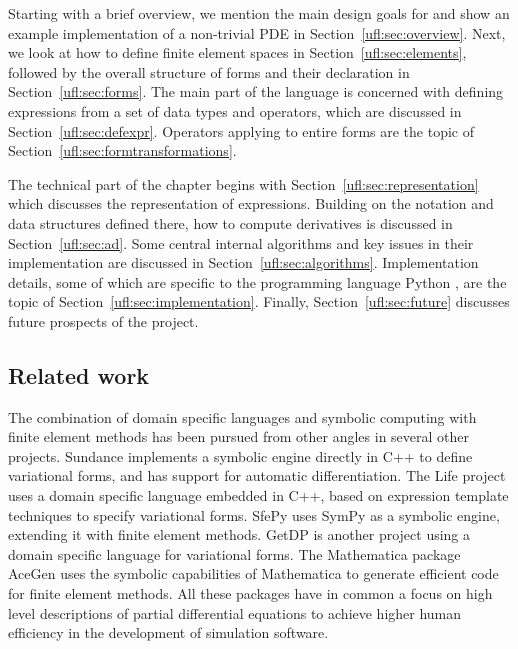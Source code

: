 Starting with a brief overview, we mention the main design goals for
\ufl{} and show an example implementation of a non-trivial PDE in
Section~\ref{ufl:sec:overview}.  Next, we look at how to define finite
element spaces in Section~\ref{ufl:sec:elements}, followed by the
overall structure of forms and their declaration in
Section~\ref{ufl:sec:forms}.  The main part of the language is
concerned with defining expressions from a set of data types and
operators, which are discussed in Section~\ref{ufl:sec:defexpr}.
Operators applying to entire forms are the topic of
Section~\ref{ufl:sec:formtransformations}.

The technical part of the chapter begins with
Section~\ref{ufl:sec:representation} which discusses the
representation of expressions.  Building on the notation and
data structures defined there, how to compute derivatives is
discussed in Section~\ref{ufl:sec:ad}.  Some central internal
algorithms and key issues in their implementation are discussed in
Section~\ref{ufl:sec:algorithms}.  Implementation details, some of which
are specific to the programming language Python \citep{Rossumothers},
are the topic of Section~\ref{ufl:sec:implementation}.  Finally,
Section~\ref{ufl:sec:future} discusses future prospects of the \ufl{}
project.

\subsection{Related work} \label{ufl:sec:related}

The combination of domain specific languages and symbolic computing
with finite element methods has been pursued from other angles in
several other projects.  Sundance \citep{Long2003,Long2004a,Long2004}
implements a symbolic engine directly in C++ to define variational
forms, and has support for automatic differentiation.  The Life
\citep{Prudhomme2006a,Prudhomme2006} project uses a domain specific
language embedded in C++, based on expression template techniques
to specify variational forms.  SfePy \citep{Cimrman2008} uses SymPy
as a symbolic engine, extending it with finite element methods.
GetDP \citep{DularGeuzaine2005} is another project using a domain
specific language for variational forms.  The Mathematica package
AceGen \citep{Korelc1997,Korelc2002} uses the symbolic capabilities
of Mathematica to generate efficient code for finite element methods.
All these packages have in common a focus on high level descriptions
of partial differential equations to achieve higher human efficiency in
the development of simulation software.

